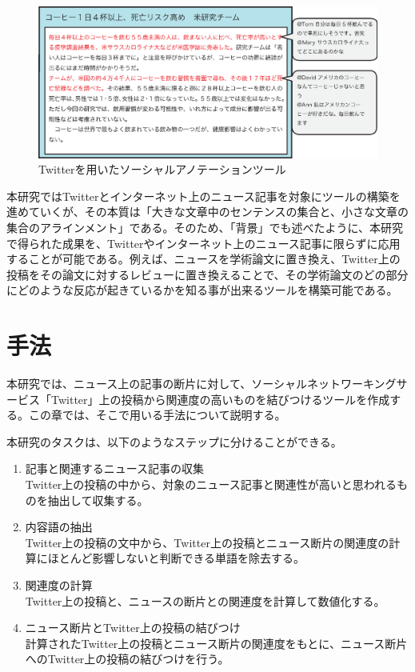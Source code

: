 \documentclass[12pt]{jarticle}
\begin{document}
\begin{figure}[htbp]
  \begin{center}
    \includegraphics{ai/social_annotation.eps}
  \end{center}
  \caption{Twitterを用いたソーシャルアノテーションツール}
  \label{fig1}
\end{figure}

本研究ではTwitterとインターネット上のニュース記事を対象にツールの構築を進めていくが、その本質は「大きな文章中のセンテンスの集合と、小さな文章の集合のアラインメント」である。そのため、「背景」でも述べたように、本研究で得られた成果を、Twitterやインターネット上のニュース記事に限らずに応用することが可能である。例えば、ニュースを学術論文に置き換え、Twitter上の投稿をその論文に対するレビューに置き換えることで、その学術論文のどの部分にどのような反応が起きているかを知る事が出来るツールを構築可能である。

\newpage

\section{手法}
本研究では、ニュース上の記事の断片に対して、ソーシャルネットワーキングサービス「Twitter」上の投稿から関連度の高いものを結びつけるツールを作成する。この章では、そこで用いる手法について説明する。

本研究のタスクは、以下のようなステップに分けることができる。

\begin{enumerate}
  \item 記事と関連するニュース記事の収集\\
    Twitter上の投稿の中から、対象のニュース記事と関連性が高いと思われるものを抽出して収集する。
  \item 内容語の抽出\\
    Twitter上の投稿の文中から、Twitter上の投稿とニュース断片の関連度の計算にほとんど影響しないと判断できる単語を除去する。
  \item 関連度の計算\\
    Twitter上の投稿と、ニュースの断片との関連度を計算して数値化する。
  \item ニュース断片とTwitter上の投稿の結びつけ\\
    計算されたTwitter上の投稿とニュース断片の関連度をもとに、ニュース断片へのTwitter上の投稿の結びつけを行う。
\end{enumerate}
\end{document}
